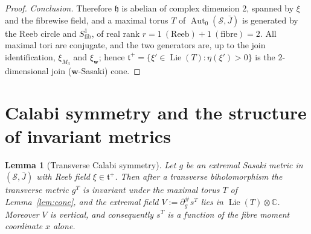 \documentclass{amsart}
\newtheorem{lemma}{Lemma}
\theoremstyle{definition}
\DeclareMathOperator{\Aut}{Aut}
\DeclareMathOperator{\Lie}{Lie}
\begin{document}
\begin{proof}
\emph{Conclusion.} Therefore $\mathfrak h$ is abelian of complex dimension $2$,
spanned by $\xi$ and the fibrewise field, and a maximal torus $T$ of
$\Aut_0(\mathcal S,\bar J)$ is generated by the Reeb circle and
$S^1_{\mathrm{fib}}$, of real rank
$r = 1\ (\text{Reeb}) + 1\ (\text{fibre}) = 2$.
All maximal tori are conjugate, and the two generators are, up to the join
identification, $\xi_{M_3}$ and $\xi_{\mathbf w}$; hence
$\mathfrak t^+=\{\xi'\in\Lie(T):\eta(\xi')>0\}$ is the $2$-dimensional join
($\mathbf w$-Sasaki) cone.
\end{proof}

\section{Calabi symmetry and the structure of invariant metrics}

\begin{lemma}[Transverse Calabi symmetry]\label{lem:average}
Let $g$ be an extremal Sasaki metric in $(\mathcal S,\bar J)$ with Reeb field
$\xi\in\mathfrak t^+$. Then after a transverse biholomorphism the transverse
metric $g^T$ is invariant under the maximal torus $T$ of Lemma~\ref{lem:cone},
and the extremal field $V:=\partial^\#_g s^T$ lies in $\Lie(T)\otimes\mathbb C$.
Moreover $V$ is \emph{vertical}, and consequently $s^T$ is a function of the
fibre moment coordinate $x$ alone.
\end{lemma}
\end{document}
